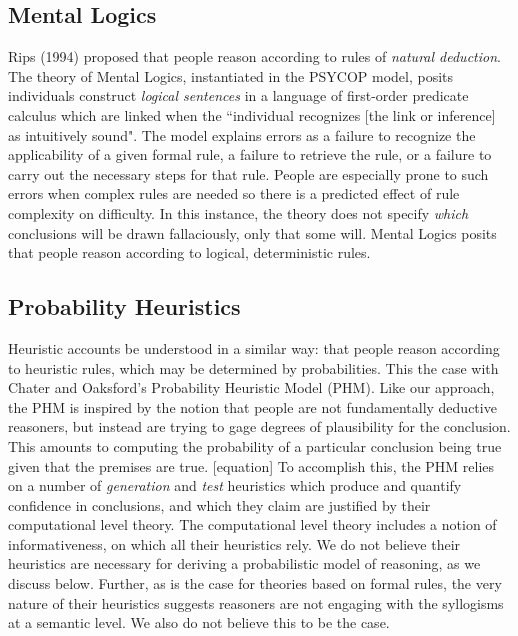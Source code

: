 \documentclass[10pt,letterpaper]{article}
\begin{document}

\subsection{Mental Logics}

Rips (1994) proposed that people reason according to rules of \emph{natural deduction}. The theory of Mental Logics, instantiated in the PSYCOP model, posits individuals construct \emph{logical sentences} in a language of first-order predicate calculus which are linked when the ``individual recognizes [the link or inference] as intuitively sound". The model explains errors as a failure to recognize the applicability of a given formal rule, a failure to retrieve the rule, or a failure to carry out the necessary steps for that rule. People are especially prone to such errors when complex rules are needed so there is a predicted effect of rule complexity on difficulty. In this instance, the theory does not specify \emph{which} conclusions will be drawn fallaciously, only that some will. Mental Logics posits that people reason according to logical, deterministic rules. 

\subsection{Probability Heuristics}

Heuristic accounts be understood in a similar way: that people reason according to heuristic rules, which may be determined by probabilities. This the case with Chater and Oaksford's Probability Heuristic Model (PHM). Like our approach, the PHM is inspired by the notion that people are not fundamentally deductive reasoners, but instead are trying to gage degrees of plausibility for the conclusion. This amounts to computing the probability of a particular conclusion being true given that the premises are true. [equation] To accomplish this, the PHM relies on a number of {\em generation} and {\em test} heuristics which produce and quantify confidence in conclusions, and which they claim are justified by their computational level theory. The computational level theory includes a notion of informativeness, on which all their heuristics rely. We do not believe their heuristics are necessary for deriving a probabilistic model of reasoning, as we discuss below. Further, as is the case for theories based on formal rules, the very nature of their heuristics suggests reasoners are not engaging with the syllogisms at a semantic level. We also do not believe this to be the case. 
\end{document}
